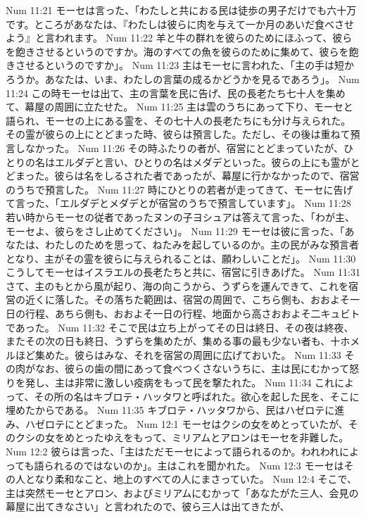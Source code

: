 Num 11:21  モーセは言った、「わたしと共におる民は徒歩の男子だけでも六十万です。ところがあなたは、『わたしは彼らに肉を与えて一か月のあいだ食べさせよう』と言われます。
Num 11:22  羊と牛の群れを彼らのためにほふって、彼らを飽きさせるというのですか。海のすべての魚を彼らのために集めて、彼らを飽きさせるというのですか」。
Num 11:23  主はモーセに言われた、「主の手は短かろうか。あなたは、いま、わたしの言葉の成るかどうかを見るであろう」。
Num 11:24  この時モーセは出て、主の言葉を民に告げ、民の長老たち七十人を集めて、幕屋の周囲に立たせた。
Num 11:25  主は雲のうちにあって下り、モーセと語られ、モーセの上にある霊を、その七十人の長老たちにも分け与えられた。その霊が彼らの上にとどまった時、彼らは預言した。ただし、その後は重ねて預言しなかった。
Num 11:26  その時ふたりの者が、宿営にとどまっていたが、ひとりの名はエルダデと言い、ひとりの名はメダデといった。彼らの上にも霊がとどまった。彼らは名をしるされた者であったが、幕屋に行かなかったので、宿営のうちで預言した。
Num 11:27  時にひとりの若者が走ってきて、モーセに告げて言った、「エルダデとメダデとが宿営のうちで預言しています」。
Num 11:28  若い時からモーセの従者であったヌンの子ヨシュアは答えて言った、「わが主、モーセよ、彼らをさし止めてください」。
Num 11:29  モーセは彼に言った、「あなたは、わたしのためを思って、ねたみを起しているのか。主の民がみな預言者となり、主がその霊を彼らに与えられることは、願わしいことだ」。
Num 11:30  こうしてモーセはイスラエルの長老たちと共に、宿営に引きあげた。
Num 11:31  さて、主のもとから風が起り、海の向こうから、うずらを運んできて、これを宿営の近くに落した。その落ちた範囲は、宿営の周囲で、こちら側も、おおよそ一日の行程、あちら側も、おおよそ一日の行程、地面から高さおおよそ二キュビトであった。
Num 11:32  そこで民は立ち上がってその日は終日、その夜は終夜、またその次の日も終日、うずらを集めたが、集める事の最も少ない者も、十ホメルほど集めた。彼らはみな、それを宿営の周囲に広げておいた。
Num 11:33  その肉がなお、彼らの歯の間にあって食べつくさないうちに、主は民にむかって怒りを発し、主は非常に激しい疫病をもって民を撃たれた。
Num 11:34  これによって、その所の名はキブロテ・ハッタワと呼ばれた。欲心を起した民を、そこに埋めたからである。
Num 11:35  キブロテ・ハッタワから、民はハゼロテに進み、ハゼロテにとどまった。
Num 12:1  モーセはクシの女をめとっていたが、そのクシの女をめとったゆえをもって、ミリアムとアロンはモーセを非難した。
Num 12:2  彼らは言った、「主はただモーセによって語られるのか。われわれによっても語られるのではないのか」。主はこれを聞かれた。
Num 12:3  モーセはその人となり柔和なこと、地上のすべての人にまさっていた。
Num 12:4  そこで、主は突然モーセとアロン、およびミリアムにむかって「あなたがた三人、会見の幕屋に出てきなさい」と言われたので、彼ら三人は出てきたが、
